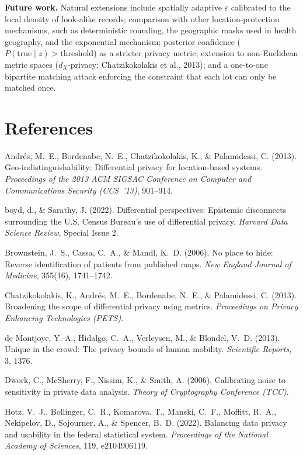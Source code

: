 \documentclass[11pt]{article}
\begin{document}
\textbf{Future work.} Natural extensions include spatially adaptive $\varepsilon$ calibrated to the local density of look-alike records; comparison with other location-protection mechanisms, such as deterministic rounding, the geographic masks used in health geography, and the exponential mechanism; posterior confidence ($P(\text{true} \mid z) > \text{threshold}$) as a stricter privacy metric; extension to non-Euclidean metric spaces ($d_X$-privacy; Chatzikokolakis et al., 2013); and a one-to-one bipartite matching attack enforcing the constraint that each lot can only be matched once.

\section*{References}

\noindent Andr\'es, M.~E., Bordenabe, N.~E., Chatzikokolakis, K., \& Palamidessi, C. (2013). Geo-indistinguishability: Differential privacy for location-based systems. \textit{Proceedings of the 2013 ACM SIGSAC Conference on Computer and Communications Security (CCS~'13)}, 901--914.

\noindent boyd, d., \& Sarathy, J. (2022). Differential perspectives: Epistemic disconnects surrounding the U.S. Census Bureau's use of differential privacy. \textit{Harvard Data Science Review}, Special Issue 2.

\noindent Brownstein, J.~S., Cassa, C.~A., \& Mandl, K.~D. (2006). No place to hide: Reverse identification of patients from published maps. \textit{New England Journal of Medicine}, 355(16), 1741--1742.

\noindent Chatzikokolakis, K., Andr\'es, M.~E., Bordenabe, N.~E., \& Palamidessi, C. (2013). Broadening the scope of differential privacy using metrics. \textit{Proceedings on Privacy Enhancing Technologies (PETS)}.

\noindent de Montjoye, Y.-A., Hidalgo, C.~A., Verleysen, M., \& Blondel, V.~D. (2013). Unique in the crowd: The privacy bounds of human mobility. \textit{Scientific Reports}, 3, 1376.

\noindent Dwork, C., McSherry, F., Nissim, K., \& Smith, A. (2006). Calibrating noise to sensitivity in private data analysis. \textit{Theory of Cryptography Conference (TCC)}.

\noindent Hotz, V.~J., Bollinger, C.~R., Komarova, T., Manski, C.~F., Moffitt, R.~A., Nekipelov, D., Sojourner, A., \& Spencer, B.~D. (2022). Balancing data privacy and usability in the federal statistical system. \textit{Proceedings of the National Academy of Sciences}, 119, e2104906119.
\end{document}

